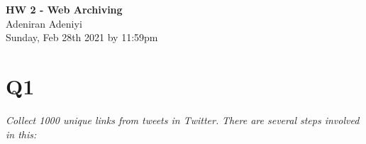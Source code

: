 \documentclass[12pt]{article}
\begin{document}
\begin{centering}
{\large\textbf{HW 2 - Web Archiving}}\\ %
Adeniran Adeniyi\\                     %
Sunday, Feb 28th 2021  by 11:59pm\\                      %
\end{centering}



\section*{Q1}

\emph{Collect 1000 unique links from tweets in Twitter.
}
\newline
\emph{There are several steps involved in this:}
\newline
\end{document}
